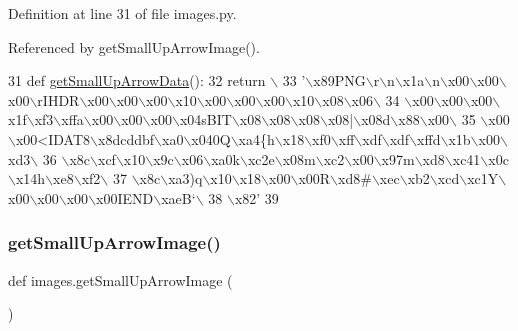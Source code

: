 Definition at line 31 of file images.\+py.



Referenced by get\+Small\+Up\+Arrow\+Image().


\begin{DoxyCode}
31 \textcolor{keyword}{def }\hyperlink{namespaceimages_a2522e9e21e8cfb2a4f7473e90710926a}{getSmallUpArrowData}():
32     \textcolor{keywordflow}{return} \(\backslash\)
33 \textcolor{stringliteral}{'\(\backslash\)x89PNG\(\backslash\)r\(\backslash\)n\(\backslash\)x1a\(\backslash\)n\(\backslash\)x00\(\backslash\)x00\(\backslash\)x00\(\backslash\)rIHDR\(\backslash\)x00\(\backslash\)x00\(\backslash\)x00\(\backslash\)x10\(\backslash\)x00\(\backslash\)x00\(\backslash\)x00\(\backslash\)x10\(\backslash\)x08\(\backslash\)x06\(\backslash\)}
34 \textcolor{stringliteral}{\(\backslash\)x00\(\backslash\)x00\(\backslash\)x00\(\backslash\)x1f\(\backslash\)xf3\(\backslash\)xffa\(\backslash\)x00\(\backslash\)x00\(\backslash\)x00\(\backslash\)x04sBIT\(\backslash\)x08\(\backslash\)x08\(\backslash\)x08\(\backslash\)x08|\(\backslash\)x08d\(\backslash\)x88\(\backslash\)x00\(\backslash\)}
35 \textcolor{stringliteral}{\(\backslash\)x00\(\backslash\)x00<IDAT8\(\backslash\)x8dcddbf\(\backslash\)xa0\(\backslash\)x040Q\(\backslash\)xa4\{h\(\backslash\)x18\(\backslash\)xf0\(\backslash\)xff\(\backslash\)xdf\(\backslash\)xdf\(\backslash\)xffd\(\backslash\)x1b\(\backslash\)x00\(\backslash\)xd3\(\backslash\)}
36 \textcolor{stringliteral}{\(\backslash\)x8c\(\backslash\)xcf\(\backslash\)x10\(\backslash\)x9c\(\backslash\)x06\(\backslash\)xa0k\(\backslash\)xc2e\(\backslash\)x08m\(\backslash\)xc2\(\backslash\)x00\(\backslash\)x97m\(\backslash\)xd8\(\backslash\)xc41\(\backslash\)x0c \(\backslash\)x14h\(\backslash\)xe8\(\backslash\)xf2\(\backslash\)}
37 \textcolor{stringliteral}{\(\backslash\)x8c\(\backslash\)xa3)q\(\backslash\)x10\(\backslash\)x18\(\backslash\)x00\(\backslash\)x00R\(\backslash\)xd8#\(\backslash\)xec\(\backslash\)xb2\(\backslash\)xcd\(\backslash\)xc1Y\(\backslash\)x00\(\backslash\)x00\(\backslash\)x00\(\backslash\)x00IEND\(\backslash\)xaeB`\(\backslash\)}
38 \textcolor{stringliteral}{\(\backslash\)x82'}
39 
\end{DoxyCode}
\mbox{\label{namespaceimages_a54f4855e6e5fab39abeede5398a86eb0}} 
\subsubsection{\texorpdfstring{get\+Small\+Up\+Arrow\+Image()}{getSmallUpArrowImage()}}
{\footnotesize\ttfamily def images.\+get\+Small\+Up\+Arrow\+Image (\begin{DoxyParamCaption}{ }\end{DoxyParamCaption})}



